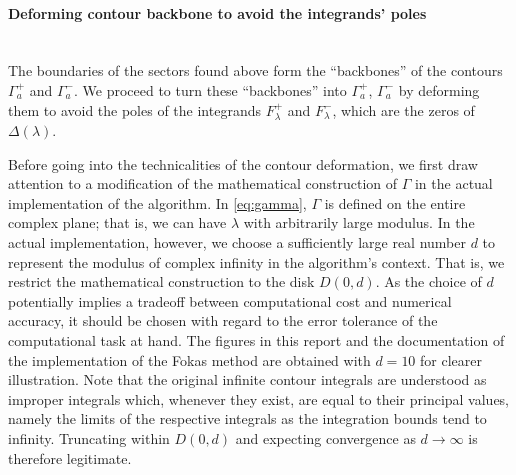 \documentclass[12pt, oneside, a4paper]{article}
\begin{document}
\paragraph{Deforming contour backbone to avoid the integrands' poles}\label{sec:deform_contours}\mbox{}\\
The boundaries of the sectors found above form the ``backbones'' of the contours $\Gamma_a^+$ and $\Gamma_a^-$. We proceed to turn these ``backbones'' into $\Gamma_a^+$, $\Gamma_a^-$ by deforming them to avoid  the poles of the integrands $F^+_\lambda$ and $F^-_\lambda$, which are the zeros of $\Delta(\lambda)$. 

Before going into the technicalities of the contour deformation, we first draw attention to a modification of the mathematical construction of $\Gamma$ in the actual implementation of the algorithm. In \eqref{eq:gamma}, $\Gamma$ is defined on the entire complex plane; that is, we can have $\lambda$ with arbitrarily large modulus. In the actual implementation, however, we choose a sufficiently large real number $d$ to represent the modulus of complex infinity in the algorithm's context. That is, we restrict the mathematical construction to the disk $D(0, d)$. As the choice of $d$ potentially implies a tradeoff between computational cost and numerical accuracy, it should be chosen with regard to the error tolerance of the computational task at hand. The figures in this report and the documentation of the implementation of the Fokas method \cite{Xiao} are obtained with $d=10$ for clearer illustration. Note that the original infinite contour integrals are understood as improper integrals which, whenever they exist, are equal to their principal values, namely the limits of the respective integrals as the integration bounds tend to infinity. Truncating within $D(0,d)$ and expecting convergence as $d\to\infty$ is therefore legitimate.
\end{document}
